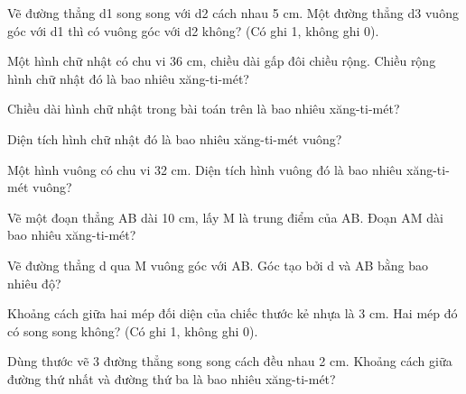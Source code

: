 \begin{ex}
Vẽ đường thẳng d1 song song với d2 cách nhau 5 cm. Một đường thẳng d3 vuông góc với d1 thì có vuông góc với d2 không? (Có ghi 1, không ghi 0).
\end{ex}

\begin{ex}
Một hình chữ nhật có chu vi 36 cm, chiều dài gấp đôi chiều rộng. Chiều rộng hình chữ nhật đó là bao nhiêu xăng-ti-mét?
\end{ex}

\begin{ex}
Chiều dài hình chữ nhật trong bài toán trên là bao nhiêu xăng-ti-mét?
\end{ex}

\begin{ex}
Diện tích hình chữ nhật đó là bao nhiêu xăng-ti-mét vuông?
\end{ex}

\begin{ex}
Một hình vuông có chu vi 32 cm. Diện tích hình vuông đó là bao nhiêu xăng-ti-mét vuông?
\end{ex}

\begin{ex}
Vẽ một đoạn thẳng AB dài 10 cm, lấy M là trung điểm của AB. Đoạn AM dài bao nhiêu xăng-ti-mét?
\end{ex}

\begin{ex}
Vẽ đường thẳng d qua M vuông góc với AB. Góc tạo bởi d và AB bằng bao nhiêu độ?
\end{ex}

\begin{ex}
Khoảng cách giữa hai mép đối diện của chiếc thước kẻ nhựa là 3 cm. Hai mép đó có song song không? (Có ghi 1, không ghi 0).
\end{ex}

\begin{ex}
Dùng thước vẽ 3 đường thẳng song song cách đều nhau 2 cm. Khoảng cách giữa đường thứ nhất và đường thứ ba là bao nhiêu xăng-ti-mét?
\end{ex}

